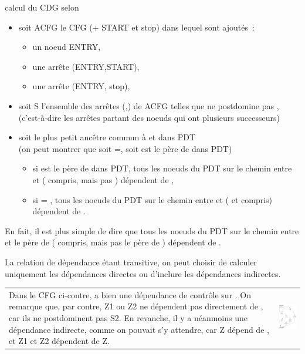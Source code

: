 \begin{algo}{calcul du CDG selon \cite{Ferrante87}}
\begin{itemize}
\item soit ACFG le CFG (+ START et {\sc stop}) dans lequel sont ajoutés~:
  \begin{itemize}
    \item un noeud ENTRY,
    \item une arrête (ENTRY,START),
    \item une arrête (ENTRY,
      {\sc stop}),
  \end{itemize}
\item soit S l'ensemble des arrêtes (,) de ACFG
  telles que  ne postdomine pas , \\
  (c'est-à-dire les arrêtes partant des noeuds  qui ont plusieurs successeurs)
\item soit  le plus petit ancêtre commun à  et  dans PDT\\
  (on peut montrer que soit =, soit  est le père de  dans PDT)
  \begin{itemize}
    \item si  est le père de  dans PDT, tous les noeuds du PDT sur le chemin
      entre  et  ( compris, mais pas ) dépendent de ,
    \item si  = , tous les noeuds du PDT sur le chemin
      entre  et  ( et  compris) dépendent de .
  \end{itemize}
\end{itemize}
En fait, il est plus simple de dire que  tous les noeuds du PDT sur le chemin
entre  et le père de  ( compris, mais pas le père de ) dépendent de
.
\end{algo}

La relation de dépendance étant transitive, on peut choisir de calculer
uniquement les dépendances directes ou d'inclure les dépendances indirectes.

\begin{exemple}
\begin{tabular}{m{8cm}m{4cm}}
  Dans le CFG ci-contre, \n{b} a bien une dépendance de contrôle sur \n{a}.
  On remarque que, par contre, Z1 ou Z2 ne dépendent pas directement de \n{a},
  car ils ne postdominent pas S2. En revanche, il y a néanmoins une dépendance
  indirecte, comme on pouvait s'y attendre, car Z dépend de \n{a}, et Z1 et Z2
  dépendent de Z.
&
\includegraphics[width=4cm]{ctrl-dpds}
\end{tabular}
\end{exemple}

